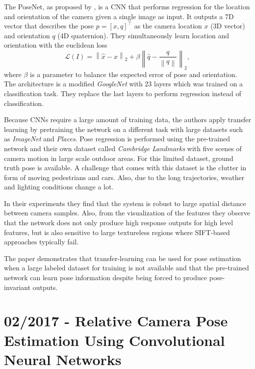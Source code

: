 		The PoseNet, as proposed by \cite{kendall2015posenet}, is a CNN that performs regression for the location and orientation of the camera given a single image as input.
		It outputs a 7D vector that describes the pose $p = [x, q]^\top$ as the camera location $x$ (3D vector) and orientation $q$ (4D quaternion).
		They simultaneously learn location and orientation with the euclidean loss
		\begin{equation}
			\mathcal{L}(I) = 
			\left\|
				\hat{x} - x 
			\right\|_2 
			+ \beta 
			\left\| 
				\hat{q} - \frac{q}{\left\| q \right\|} 
			\right\|_2,
		\end{equation}
		where $\beta$ is a parameter to balance the expected error of pose and orientation.
		The architecture is a modified \emph{GoogleNet} with 23 layers which was trained on a classification task.
		They replace the last layers to perform regression instead of classification.
		
		Because CNNs require a large amount of training data, the authors apply transfer learning by pretraining the network on a different task with large datasets such as \emph{ImageNet} and \emph{Places}.
		Pose regression is performed using the pre-trained network and their own dataset called \emph{Cambridge Landmarks} with five scenes of camera motion in large scale outdoor areas.
		For this limited dataset, ground truth pose is available.
		A challenge that comes with this dataset is the clutter in form of moving pedestrians and cars.
		Also, due to the long trajectories, weather and lighting conditions change a lot.
		
		In their experiments they find that the system is robust to large spatial distance between camera samples.
		Also, from the visualization of the features they observe that the network does not only produce high response outputs for high level features, but is also sensitive to large textureless regions where {SIFT}-based approaches typically fail.
		
		The paper demonstrates that transfer-learning can be used for pose estimation when a large labeled dataset for training is not available and that the pre-trained network can learn pose information despite being forced to produce pose-invariant outputs.
	
	\section{02/2017 - Relative Camera Pose Estimation Using Convolutional Neural Networks}
	
